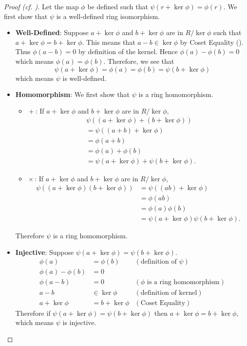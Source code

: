 \begin{proof}[Proof (cf. {\cite[p.~302, Factor Theorem For Rings]{cohn_1982}})]
    Let the map $\phi$ be defined such that $\psi(r + \ker\phi) = \phi(r)$. We first show that $\psi$ is a well-defined ring isomorphism.
    \begin{itemize}
        \item \textbf{Well-Defined}: Suppose $a + \ker\phi$ and $b + \ker\phi$ are in $R/\ker\phi$ such that $a + \ker\phi = b+\ker\phi$. This means that $a - b \in \ker\phi$ by Coset Equality (). Thus $\phi(a-b) = 0$ by definition of the kernel. Hence $\phi(a) - \phi(b) = 0$ which means $\phi(a) = \phi(b)$. Therefore, we see that
        \[
            \psi(a + \ker\phi) = \phi(a) = \phi(b) = \psi(b + \ker\phi)
        \]
        which means $\psi$ is well-defined.

        \item \textbf{Homomorphism}: We first show that $\psi$ is a ring homomorphism.
        \begin{itemize}
            \item $\boxed{+}$: If $a + \ker\phi$ and $b + \ker\phi$ are in $R/\ker\phi$,
            \begin{align*}
                &\psi((a + \ker\phi)+(b+\ker\phi))\\
                &= \psi((a+b)+\ker\phi)\\
                &= \phi(a+b)\\
                &= \phi(a) + \phi(b)\\
                &= \psi(a + \ker\phi) + \psi(b + \ker\phi).
            \end{align*}
            \item $\boxed{\times}$: If $a + \ker\phi$ and $b + \ker\phi$ are in $R/\ker\phi$,
            \begin{align*}
                \psi((a + \ker\phi)(b+\ker\phi)) &= \psi((ab)+\ker\phi)\\
                &= \phi(ab)\\
                &= \phi(a)\phi(b)\\
                &= \psi(a + \ker\phi)\psi(b + \ker\phi).
            \end{align*}
        \end{itemize}
        Therefore $\psi$ is a ring homomorphism.

        \item \textbf{Injective}: Suppose $\psi(a+\ker\phi) = \psi(b+\ker\phi)$.
        \begin{align*}
            \phi(a) &= \phi(b) & (\text{definition of }\psi)\\
            \phi(a) - \phi(b) &= 0\\
            \phi(a-b) &= 0 & (\phi \text{ is a ring homomorphism})\\
            a - b &\in \ker\phi & (\text{definition of kernel})\\
            a + \ker\phi &= b + \ker\phi & (\text{Coset Equality})
        \end{align*}
        Therefore if $\psi(a+\ker\phi) = \psi(b+\ker\phi)$ then $a+\ker\phi = b+\ker\phi$, which means $\psi$ is injective.


\end{itemize}
\end{proof}

